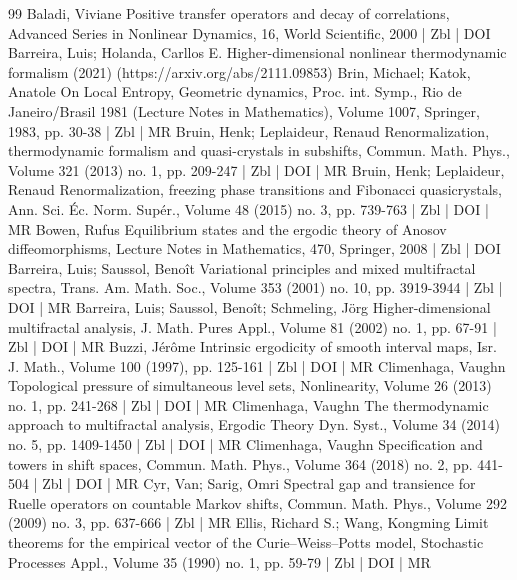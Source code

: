 \begin{thebibliography}{99}
Baladi, Viviane Positive transfer operators and decay of correlations, Advanced Series in Nonlinear Dynamics, 16, World Scientific, 2000 | Zbl | DOI
Barreira, Luis; Holanda, Carllos E. Higher-dimensional nonlinear thermodynamic formalism (2021) (https://arxiv.org/abs/2111.09853)
Brin, Michael; Katok, Anatole On Local Entropy, Geometric dynamics, Proc. int. Symp., Rio de Janeiro/Brasil 1981 (Lecture Notes in Mathematics), Volume 1007, Springer, 1983, pp. 30-38 | Zbl | MR
Bruin, Henk; Leplaideur, Renaud Renormalization, thermodynamic formalism and quasi-crystals in subshifts, Commun. Math. Phys., Volume 321 (2013) no. 1, pp. 209-247 | Zbl | DOI | MR
Bruin, Henk; Leplaideur, Renaud Renormalization, freezing phase transitions and Fibonacci quasicrystals, Ann. Sci. Éc. Norm. Supér., Volume 48 (2015) no. 3, pp. 739-763 | Zbl | DOI | MR
Bowen, Rufus Equilibrium states and the ergodic theory of Anosov diffeomorphisms, Lecture Notes in Mathematics, 470, Springer, 2008 | Zbl | DOI
Barreira, Luis; Saussol, Benoît Variational principles and mixed multifractal spectra, Trans. Am. Math. Soc., Volume 353 (2001) no. 10, pp. 3919-3944 | Zbl | DOI | MR
Barreira, Luis; Saussol, Benoît; Schmeling, Jörg Higher-dimensional multifractal analysis, J. Math. Pures Appl., Volume 81 (2002) no. 1, pp. 67-91 | Zbl | DOI | MR
Buzzi, Jérôme Intrinsic ergodicity of smooth interval maps, Isr. J. Math., Volume 100 (1997), pp. 125-161 | Zbl | DOI | MR
Climenhaga, Vaughn Topological pressure of simultaneous level sets, Nonlinearity, Volume 26 (2013) no. 1, pp. 241-268 | Zbl | DOI | MR
Climenhaga, Vaughn The thermodynamic approach to multifractal analysis, Ergodic Theory Dyn. Syst., Volume 34 (2014) no. 5, pp. 1409-1450 | Zbl | DOI | MR
Climenhaga, Vaughn Specification and towers in shift spaces, Commun. Math. Phys., Volume 364 (2018) no. 2, pp. 441-504 | Zbl | DOI | MR
Cyr, Van; Sarig, Omri Spectral gap and transience for Ruelle operators on countable Markov shifts, Commun. Math. Phys., Volume 292 (2009) no. 3, pp. 637-666 | Zbl | MR
Ellis, Richard S.; Wang, Kongming Limit theorems for the empirical vector of the Curie–Weiss–Potts model, Stochastic Processes Appl., Volume 35 (1990) no. 1, pp. 59-79 | Zbl | DOI | MR

\end{thebibliography}
